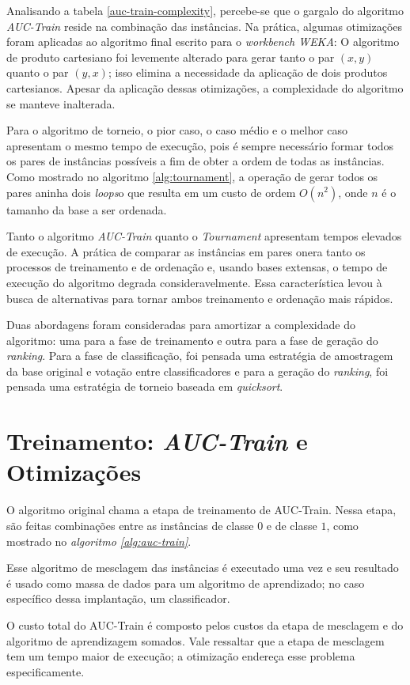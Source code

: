 Analisando a tabela \ref{auc-train-complexity}, percebe-se que o gargalo do algoritmo \emph{AUC-Train} reside na combinação das instâncias. Na prática, algumas otimizações foram aplicadas ao algoritmo final escrito para o \emph{workbench WEKA}:
O algoritmo de produto cartesiano foi levemente alterado para gerar tanto o par $(x, y)$ quanto o par $(y, x)$; isso elimina a necessidade da aplicação de dois produtos cartesianos. Apesar da aplicação dessas otimizações, a complexidade do algoritmo se manteve inalterada.

Para o algoritmo de torneio, o pior caso, o caso médio e o melhor caso apresentam o mesmo tempo de execução, pois é sempre necessário formar todos os pares de instâncias possíveis a fim de obter a ordem de todas as instâncias. Como mostrado no algoritmo \ref{alg:tournament}, a operação de gerar todos os pares aninha dois \emph{loops}o que resulta em um custo de ordem $O(n^2)$, onde $n$ é o tamanho da base a ser ordenada.

Tanto o algoritmo \emph{AUC-Train} quanto o \emph{Tournament} apresentam tempos elevados de execução. A prática de comparar as instâncias em pares onera tanto os processos de treinamento e de ordenação e, usando bases extensas, o tempo de execução do algoritmo degrada consideravelmente. Essa característica levou à busca de alternativas para tornar ambos treinamento e ordenação mais rápidos.

Duas abordagens foram consideradas para amortizar a complexidade do algoritmo: uma para a fase de treinamento e outra para a fase de geração do \emph{ranking}. Para a fase de classificação, foi pensada uma estratégia de amostragem da base original e votação entre classificadores e para a geração do \emph{ranking}, foi pensada uma estratégia de torneio baseada em \emph{quicksort}.


\section{Treinamento: \emph{AUC-Train} e Otimizações}
O algoritmo original chama a etapa de treinamento de AUC-Train. Nessa etapa, são feitas combinações entre as instâncias de classe $0$ e de classe $1$, como mostrado no \emph{algoritmo \ref{alg:auc-train}}.

Esse algoritmo de mesclagem das instâncias é executado uma vez e seu resultado é usado como massa de dados para um algoritmo de aprendizado; no caso específico dessa implantação, um classificador.

O custo total do AUC-Train é composto pelos custos da etapa de mesclagem e do algoritmo de aprendizagem somados. Vale ressaltar que a etapa de mesclagem tem um tempo maior de execução; a otimização endereça esse problema especificamente.

